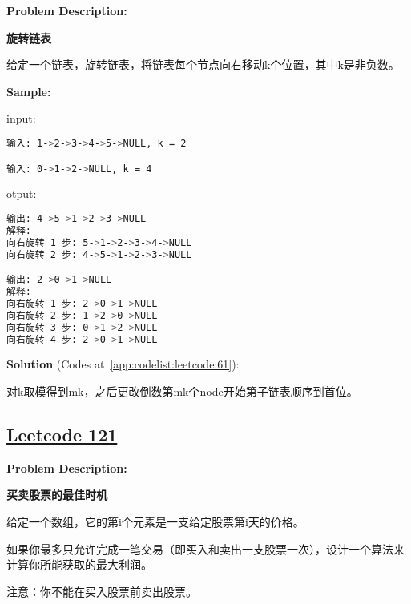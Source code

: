 \textbf{Problem Description:}\par

\textbf{旋转链表}\par

给定一个链表，旋转链表，将链表每个节点向右移动k个位置，其中k是非负数。\par


\textbf{Sample:}\par

input:\par

\begin{lstlisting}[language=bash]
输入: 1->2->3->4->5->NULL, k = 2

输入: 0->1->2->NULL, k = 4
\end{lstlisting}

otput:\par

\begin{lstlisting}[language=bash]
输出: 4->5->1->2->3->NULL
解释:
向右旋转 1 步: 5->1->2->3->4->NULL
向右旋转 2 步: 4->5->1->2->3->NULL

输出: 2->0->1->NULL
解释:
向右旋转 1 步: 2->0->1->NULL
向右旋转 2 步: 1->2->0->NULL
向右旋转 3 步: 0->1->2->NULL
向右旋转 4 步: 2->0->1->NULL
\end{lstlisting}

\textbf{Solution }(Codes at~\ref{app:codelist:leetcode:61}):\par

对k取模得到mk，之后更改倒数第mk个node开始第子链表顺序到首位。\par



\subsection{\href{https://leetcode-cn.com/}{Leetcode 121}}\label{app:problemlist:leetcode:121}

\textbf{Problem Description:}\par

\textbf{买卖股票的最佳时机}\par

给定一个数组，它的第i个元素是一支给定股票第i天的价格。\par

如果你最多只允许完成一笔交易（即买入和卖出一支股票一次），设计一个算法来计算你所能获取的最大利润。\par

注意：你不能在买入股票前卖出股票。\par


